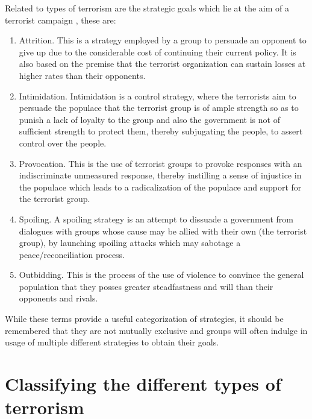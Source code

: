 Related to types of terrorism are the strategic goals which lie at the aim of a terrorist campaign \citep{kydd2006strategies}, these are:
\begin{enumerate}
\item Attrition. This is a strategy employed by a group to persuade an opponent to give up due to the considerable cost of continuing their current policy. It is also based on the premise that the terrorist organization can sustain losses at higher rates than their opponents.
\item Intimidation. Intimidation is a control strategy, where the terrorists aim to persuade the populace that the terrorist group is of ample strength so as to punish a lack of loyalty to the group and also the government is not of sufficient strength to protect them, thereby subjugating the people, to assert control over the people.
\item Provocation. This is the use of terrorist groups to provoke responses with an indiscriminate unmeasured response, thereby instilling a sense of injustice in the populace which leads to a radicalization of the populace and support for the terrorist group.
\item Spoiling. A spoiling strategy is an attempt to dissuade a government from dialogues with groups whose cause may be allied with their own (the terrorist group), by launching spoiling attacks which may sabotage a peace/reconciliation process. 
\item Outbidding. This is the process of the use of violence to convince the general population that they posses greater steadfastness and will than their opponents and rivals.
\end{enumerate}

While these terms provide a useful categorization of strategies, it should be remembered that they are not mutually exclusive and groups will often indulge in usage of multiple different strategies to obtain their goals.

\section{Classifying the different types of terrorism}

